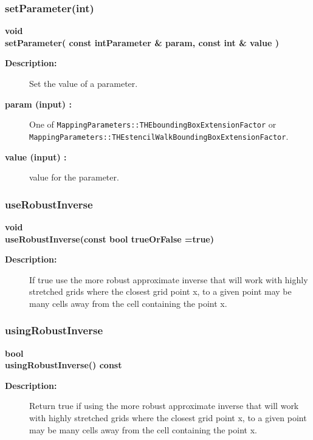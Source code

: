\subsubsection{setParameter(int)}
 
\begin{flushleft} \textbf{%
void  \\ 
\settowidth{\ApproximateGlobalInverseIncludeArgIndent}{setParameter(}%
setParameter( const  intParameter \& param, const int \& value ) 
}\end{flushleft}
\begin{description}
\item[{\bf Description:}] 
   Set the value of a parameter.
\item[{\bf param (input) :}]  One of {\tt MappingParameters::THEboundingBoxExtensionFactor}
     or {\tt MappingParameters::THEstencilWalkBoundingBoxExtensionFactor}.
\item[{\bf value (input) :}]  value for the parameter.
 
\end{description}
\subsubsection{useRobustInverse}
 
\begin{flushleft} \textbf{%
void  \\ 
\settowidth{\ApproximateGlobalInverseIncludeArgIndent}{useRobustInverse(}%
useRobustInverse(const bool trueOrFalse  =true)
}\end{flushleft}
\begin{description}
\item[{\bf Description:}] 
    If true use the more robust approximate inverse that will work with highly
 stretched grids where the closest grid point x, to a given point may be many cells
 away from the cell containing the point x.
\end{description}
\subsubsection{usingRobustInverse}
 
\begin{flushleft} \textbf{%
bool  \\ 
\settowidth{\ApproximateGlobalInverseIncludeArgIndent}{usingRobustInverse(}%
usingRobustInverse() const 
}\end{flushleft}
\begin{description}
\item[{\bf Description:}] 
    Return true if using the more robust approximate inverse that will work with highly
 stretched grids where the closest grid point x, to a given point may be many cells
 away from the cell containing the point x.
\end{description}
